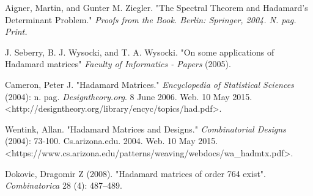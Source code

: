 \documentclass{article}
\theoremstyle{definition}
\begin{document}
\newpage
\begin{thebibliography}{1}

   Aigner, Martin, and Gunter M. Ziegler. "The Spectral Theorem and Hadamard's Determinant Problem." \emph{Proofs from the Book. Berlin: Springer, 2004. N. pag. Print.}

   J. Seberry, B. J. Wysocki, and T. A. Wysocki. "On some applications of Hadamard matrices" \emph{Faculty of Informatics - Papers} (2005).

   Cameron, Peter J. "Hadamard Matrices." \emph{Encyclopedia of Statistical Sciences} (2004): n. pag. \emph{Designtheory.org}. 8 June 2006. Web. 10 May 2015. <http://designtheory.org/library/encyc/topics/had.pdf>.

   Wentink, Allan. "Hadamard Matrices and Designs." \emph{Combinatorial Designs} (2004): 73-100. Cs.arizona.edu. 2004. Web. 10 May 2015. <https://www.cs.arizona.edu/patterns/weaving/webdocs/wa\_hadmtx.pdf>.

   Dokovic, Dragomir Z (2008). "Hadamard matrices of order 764 exist". \emph{Combinatorica} 28 (4): 487–489.

\end{thebibliography}
\end{document}

